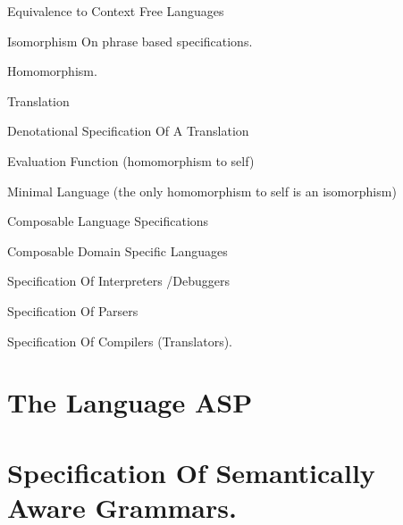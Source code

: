 \documentclass{article}
\newcommand{\nl}{\bigskip\noindent}
\begin{document}
\nl Equivalence to Context Free Languages

\nl Isomorphism On phrase based specifications.  

\nl Homomorphism.  

\nl Translation

\nl Denotational Specification Of A Translation

\nl Evaluation Function (homomorphism to self)

\nl Minimal Language (the only homomorphism to self is an isomorphism)


\nl Composable Language Specifications

\nl Composable Domain Specific Languages

\nl Specification Of Interpreters /Debuggers

\nl Specification Of Parsers

\nl Specification Of Compilers (Translators). 

\section{The Language ASP}

\section{Specification Of Semantically Aware Grammars. }
\end{document}
